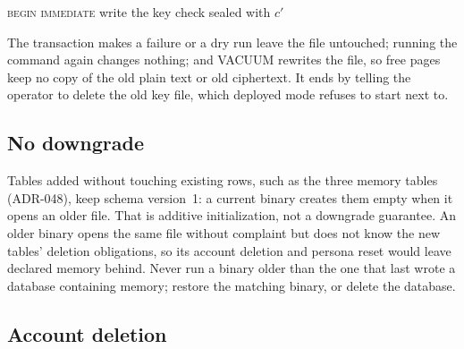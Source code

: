 \begin{algorithm}[htbp]
  \caption{Migration (\texttt{migrate}).}\label{alg:migrate}
  \textsc{begin immediate}\;
  write the key check sealed with $c'$\;
\end{algorithm}

The transaction makes a failure or a dry run leave the file untouched; running the command again changes nothing; and
VACUUM rewrites the file, so free pages keep no copy of the old plain text or old ciphertext. It ends by telling the
operator to delete the old key file, which deployed mode refuses to start next to.

\subsection{No downgrade}

Tables added without touching existing rows, such as the three memory tables (ADR-048), keep schema version~1: a
current binary creates them empty when it opens an older file. That is additive initialization, not a downgrade
guarantee. An older binary opens the same file without complaint but does not know the new tables' deletion
obligations, so its account deletion and persona reset would leave declared memory behind. Never run a binary older than
the one that last wrote a database containing memory; restore the matching binary, or delete the database.

\subsection{Account deletion}\label{sec:deletion}

